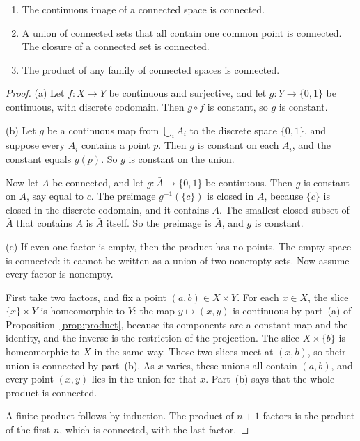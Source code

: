 \begin{proposition}\label{prop:connected}
\begin{enumerate}[label=(\alph*)]
\item The continuous image of a connected space is connected.
\item A union of connected sets that all contain one common point is connected. The closure of a connected set is connected.
\item The product of any family of connected spaces is connected.
\end{enumerate}
\end{proposition}
\begin{proof}
(a) Let $f:X\to Y$ be continuous and surjective, and let $g:Y\to\{0,1\}$ be continuous, with discrete codomain. Then $g\circ f$ is constant, so $g$ is constant.

(b) Let $g$ be a continuous map from $\bigcup_i A_i$ to the discrete space $\{0,1\}$, and suppose every $A_i$ contains a point $p$. Then $g$ is constant on each $A_i$, and the constant equals $g(p)$. So $g$ is constant on the union.

Now let $A$ be connected, and let $g:\bar A\to\{0,1\}$ be continuous. Then $g$ is constant on $A$, say equal to $c$. The preimage $g^{-1}(\{c\})$ is closed in $\bar A$, because $\{c\}$ is closed in the discrete codomain, and it contains $A$. The smallest closed subset of $\bar A$ that contains $A$ is $\bar A$ itself. So the preimage is $\bar A$, and $g$ is constant.

(c) If even one factor is empty, then the product has no points. The empty space is connected: it cannot be written as a union of two nonempty sets. Now assume every factor is nonempty.

First take two factors, and fix a point $(a,b)\in X\times Y$. For each $x\in X$, the slice $\{x\}\times Y$ is homeomorphic to $Y$: the map $y\mapsto(x,y)$ is continuous by part~(a) of Proposition~\ref{prop:product}, because its components are a constant map and the identity, and the inverse is the restriction of the projection. The slice $X\times\{b\}$ is homeomorphic to $X$ in the same way. Those two slices meet at $(x,b)$, so their union is connected by part~(b). As $x$ varies, these unions all contain $(a,b)$, and every point $(x,y)$ lies in the union for that $x$. Part~(b) says that the whole product is connected.

A finite product follows by induction. The product of $n+1$ factors is the product of the first $n$, which is connected, with the last factor.


\end{proof}
